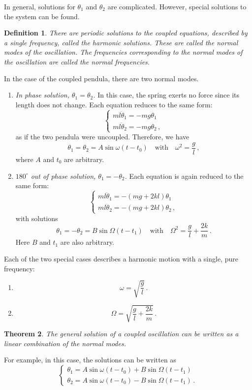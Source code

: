 \documentclass{article}
\theoremstyle{plain}\theoremheaderfont{\normalfont\itshape}\theorembodyfont{\rmfamily}\theoremseparator{.}\newtheorem*{rem}{Remark}\newtheorem*{ex}{Example}\newtheorem*{proof}{Proof}\newtheorem*{altp}{Alternative proof}
\theoremstyle{plain}\theoremheaderfont{\normalfont\bfseries}\theorembodyfont{\rmfamily}\theoremseparator{.}\newtheorem{thm}{Theorem}[section]\newtheorem{lem}[thm]{Lemma}\newtheorem{prop}[thm]{Proposition}\newtheorem*{cor}{Corollary}\newtheorem{defn}[thm]{Definition}\newtheorem{clm}[thm]{Claim}\newtheorem{clminproof}{Claim}
\theoremstyle{break}\theoremheaderfont{\normalfont\itshape}\theorembodyfont{\rmfamily}\theoremseparator{.\medskip}\newtheorem*{proofskip}{Proof}\newtheorem*{exs}{Examples}\newtheorem*{rems}{Remarks}
\theoremstyle{break}\theoremheaderfont{\normalfont\bfseries}\theorembodyfont{\rmfamily}\theoremseparator{.\medskip}\newtheorem{lemskip}[thm]{Lemma}\newtheorem{defnskip}[thm]{Definition}\newtheorem{propskip}[thm]{Proposition}\newtheorem{thmskip}[thm]{Theorem}
\numberwithin{equation}{section}
\begin{document}
	In general, solutions for \(\theta_1\) and \(\theta_2\) are complicated. However, special solutions to the system can be found.
	\begin{defn}
		There are periodic solutions to the coupled equations, described by a single frequency, called the \textit{harmonic solutions}. These are called the \textit{normal modes} of the oscillation. The frequencies corresponding to the normal modes of the oscillation are called the \textit{normal frequencies}.
	\end{defn}

	In the case of the coupled pendula, there are two normal modes.
	\begin{enumerate}[topsep=0pt]
		\item \textit{In phase solution, \(\theta_1=\theta_2\).} In this case, the spring exerts no force since its length does not change. Each equation reduces to the same form:
		\[\begin{cases}
			ml\ddot{\theta}_1=-mg\theta_1\\
			ml\ddot{\theta}_2=-mg\theta_2\,,
		\end{cases}\]
		as if the two pendula were uncoupled. Therefore, we have
		\[\theta_1=\theta_2=A\sin\omega(t-t_0)\quad\text{with}\quad\omega^2=\frac{g}{l}\,,\]
		where \(A\) and \(t_0\) are arbitrary.
		\item \textit{\(180^\circ\) out of phase solution, \(\theta_1=-\theta_2\).} Each equation is again reduced to the same form:
		\[\begin{cases}
			ml\ddot{\theta}_1=-(mg+2kl)\theta_1\\
			ml\ddot{\theta}_2=-(mg+2kl)\theta_2\,,
		\end{cases}\]
		with solutions
		\[\theta_1=-\theta_2=B\sin\Omega(t-t_1)\quad\text{with}\quad\Omega^2=\frac{g}{l}+\frac{2k}{m}\,.\]
		Here \(B\) and \(t_1\) are also arbitrary.
	\end{enumerate}

	Each of the two special cases describes a harmonic motion with a single, pure frequency:
	\begin{enumerate}[topsep=0pt]
		\item \[\omega=\sqrt{\frac{g}{l}}\,.\]
		\item \[\Omega=\sqrt{\frac{g}{l}+\frac{2k}{m}}\,.\]
	\end{enumerate}

	\begin{thm}
		The general solution of a coupled oscillation can be written as a linear combination of the normal modes.
	\end{thm}
	For example, in this case, the solutions can be written as
	\[\begin{cases}
		\theta_1=A\sin\omega(t-t_0)+B\sin\Omega(t-t_1)\\
		\theta_2=A\sin\omega(t-t_0)-B\sin\Omega(t-t_1)\,.
	\end{cases}\]
\end{document}
